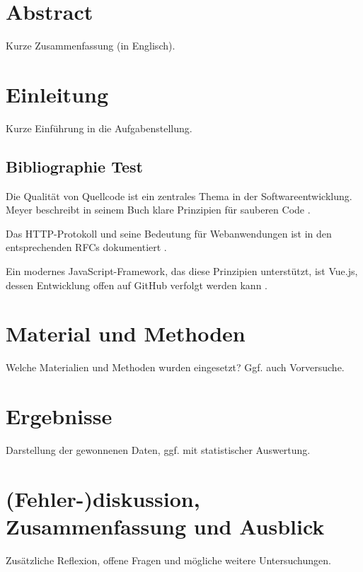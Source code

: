 \documentclass[12pt,a4paper]{article}
\begin{document}
	\tableofcontents
	\newpage
	
	\section*{Abstract}
	Kurze Zusammenfassung (in Englisch). \\
	
	\section{Einleitung}
	Kurze Einführung in die Aufgabenstellung.
	
	\subsection{Bibliographie Test}
	
	Die Qualität von Quellcode ist ein zentrales Thema in der Softwareentwicklung. Meyer beschreibt in seinem Buch klare Prinzipien für sauberen Code \cite{meyer2008clean}. 
	
	Das HTTP-Protokoll und seine Bedeutung für Webanwendungen ist in den entsprechenden RFCs dokumentiert \cite{rfc7231}.
	
	Ein modernes JavaScript-Framework, das diese Prinzipien unterstützt, ist Vue.js, dessen Entwicklung offen auf GitHub verfolgt werden kann \cite{github_vue}.
	
	\section{Material und Methoden}
	Welche Materialien und Methoden wurden eingesetzt? Ggf. auch Vorversuche.
	
	\section{Ergebnisse}
	Darstellung der gewonnenen Daten, ggf. mit statistischer Auswertung.
	
	
	\section{(Fehler-)diskussion, Zusammenfassung und Ausblick}
	Zusätzliche Reflexion, offene Fragen und mögliche weitere Untersuchungen.
	
\end{document}
